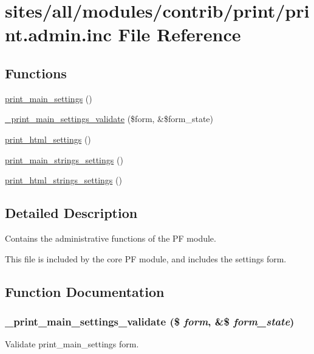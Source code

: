 \hypertarget{print_8admin_8inc}{
\section{sites/all/modules/contrib/print/print.admin.inc File Reference}
\label{print_8admin_8inc}
}
\subsection*{Functions}
\begin{CompactItemize}
\item 
\hyperlink{group__forms_g0a7214cffcd5913ec418ba687c227ae6}{print\_\-main\_\-settings} ()
\item 
\hyperlink{print_8admin_8inc_3dd3f81e6f2b50b5f198524ff1617d54}{\_\-print\_\-main\_\-settings\_\-validate} (\$form, \&\$form\_\-state)
\item 
\hyperlink{group__forms_g8cfc5989dfb4cdc66967e6cc9c4dab0f}{print\_\-html\_\-settings} ()
\item 
\hyperlink{group__forms_gdb8dcfa4733567c0396a808794e2cc99}{print\_\-main\_\-strings\_\-settings} ()
\item 
\hyperlink{group__forms_g082a0d12b2a36c3aa0d771b982ef414f}{print\_\-html\_\-strings\_\-settings} ()
\end{CompactItemize}


\subsection{Detailed Description}
Contains the administrative functions of the PF module.

This file is included by the core PF module, and includes the settings form. 

\subsection{Function Documentation}
\hypertarget{print_8admin_8inc_3dd3f81e6f2b50b5f198524ff1617d54}{
\subsubsection[{\_\-print\_\-main\_\-settings\_\-validate}]{\setlength{\rightskip}{0pt plus 5cm}\_\-print\_\-main\_\-settings\_\-validate (\$ {\em form}, \/  \&\$ {\em form\_\-state})}}
\label{print_8admin_8inc_3dd3f81e6f2b50b5f198524ff1617d54}


Validate print\_\-main\_\-settings form. 